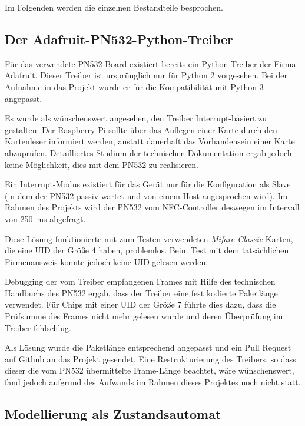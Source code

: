 \documentclass[11pt,a4paper]{IEEEtran}
\begin{document}
Im Folgenden werden die einzelnen Bestandteile besprochen.

\subsection{Der Adafruit-PN532-Python-Treiber} 

Für das verwendete PN532-Board existiert bereits ein Python-Treiber der Firma
Adafruit\autocite{AdafruitPN532}. Dieser Treiber ist ursprünglich nur für Python
2 vorgesehen. Bei der Aufnahme in das Projekt wurde er für die Kompatibilität
mit Python 3 angepasst.

Es wurde als wünschenswert angesehen, den Treiber Interrupt-basiert zu
gestalten: Der Raspberry Pi sollte über das Auflegen einer Karte durch den
Kartenleser informiert werden, anstatt dauerhaft das Vorhandensein einer Karte
abzuprüfen. Detailliertes Studium der technischen
Dokumentation\autocite{Pn532Manual} ergab jedoch keine Möglichkeit, dies mit
dem PN532 zu realisieren. 

Ein Interrupt-Modus existiert für das Gerät nur für 
die Konfiguration als Slave (in dem der PN532 passiv wartet und von einem Host
angesprochen wird). Im Rahmen des Projekts wird der PN532 vom NFC-Controller
deswegen im Intervall von \SI{250}{\milli\second} abgefragt.

Diese Lösung funktionierte mit zum Testen verwendeten \emph{Mifare Classic}
Karten, die eine UID der Größe \SI{4}{\byte} haben, problemlos. Beim Test mit
dem tatsächlichen Firmenausweis konnte jedoch keine UID gelesen werden.

Debugging der vom Treiber empfangenen Frames mit Hilfe des technischen Handbuchs
des PN532 ergab, dass der Treiber eine fest kodierte Paketlänge verwendet. Für
Chips mit einer UID der Größe \SI{7}{\byte} führte dies dazu, dass die 
Prüfsumme des Frames nicht mehr gelesen wurde und deren Überprüfung im Treiber
fehlschlug.

Als Lösung wurde die Paketlänge entsprechend angepasst und ein Pull Request auf
Github an das Projekt gesendet\autocite{AdafruitPullRequest}. Eine
Restrukturierung des Treibers, so dass dieser die vom PN532 übermittelte 
Frame-Länge beachtet, wäre wünschenswert, fand jedoch aufgrund des Aufwands
im Rahmen dieses Projektes noch nicht statt.

\subsection{Modellierung als Zustandsautomat}
\end{document}
